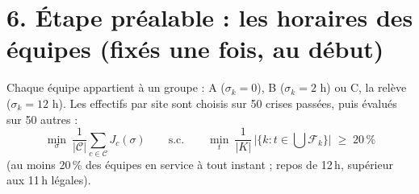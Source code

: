 \documentclass[10pt,a4paper]{article}
\begin{document}
\section*{6. Étape préalable : les horaires des équipes (fixés une fois, au début)}
Chaque équipe appartient à un groupe : A ($\sigma_k = 0$), B ($\sigma_k = 2$ h) ou C, la relève ($\sigma_k = 12$ h). Les effectifs
par site sont choisis sur 50 crises passées, puis évalués sur 50 autres :
\[
\min_{\sigma}\ \frac{1}{|\mathcal{C}|}\sum_{c \in \mathcal{C}} J_c(\sigma)
\qquad \text{s.c.}\qquad
\min_{t}\ \frac{1}{|K|}\,\big|\{k : t \in \textstyle\bigcup \mathcal{F}_k\}\big| \;\ge\; 20\,\%
\]
(au moins 20\,\% des équipes en service à tout instant ; repos de 12\,h, supérieur aux 11\,h légales).
\end{document}

